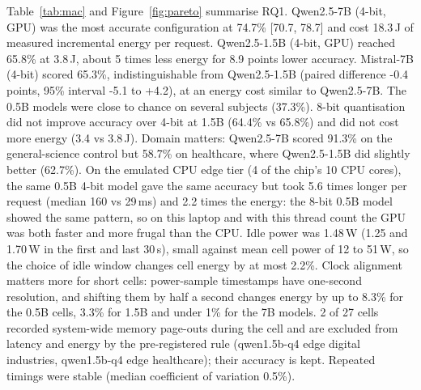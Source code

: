 Table~\ref{tab:mac} and Figure~\ref{fig:pareto} summarise RQ1. Qwen2.5-7B (4-bit, GPU) was the most accurate configuration at 74.7\% [70.7, 78.7] and cost 18.3\,J of measured incremental energy per request. Qwen2.5-1.5B (4-bit, GPU) reached 65.8\% at 3.8\,J, about 5 times less energy for 8.9 points lower accuracy. Mistral-7B (4-bit) scored 65.3\%, indistinguishable from Qwen2.5-1.5B (paired difference -0.4 points, 95\% interval -5.1 to +4.2), at an energy cost similar to Qwen2.5-7B. The 0.5B models were close to chance on several subjects (37.3\%). 8-bit quantisation did not improve accuracy over 4-bit at 1.5B (64.4\% vs 65.8\%) and did not cost more energy (3.4 vs 3.8\,J). Domain matters: Qwen2.5-7B scored 91.3\% on the general-science control but 58.7\% on healthcare, where Qwen2.5-1.5B did slightly better (62.7\%). On the emulated CPU edge tier (4 of the chip's 10 CPU cores), the same 0.5B 4-bit model gave the same accuracy but took 5.6 times longer per request (median 160 vs 29\,ms) and 2.2 times the energy: the 8-bit 0.5B model showed the same pattern, so on this laptop and with this thread count the GPU was both faster and more frugal than the CPU. Idle power was 1.48\,W (1.25 and 1.70\,W in the first and last 30\,s), small against mean cell power of 12 to 51\,W, so the choice of idle window changes cell energy by at most 2.2\%. Clock alignment matters more for short cells: power-sample timestamps have one-second resolution, and shifting them by half a second changes energy by up to 8.3\% for the 0.5B cells, 3.3\% for 1.5B and under 1\% for the 7B models. 2 of 27 cells recorded system-wide memory page-outs during the cell and are excluded from latency and energy by the pre-registered rule (qwen1.5b-q4 edge digital industries, qwen1.5b-q4 edge healthcare); their accuracy is kept. Repeated timings were stable (median coefficient of variation 0.5\%).
